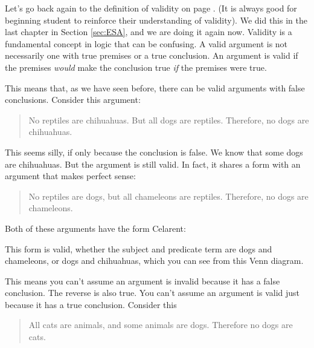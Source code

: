 Let's go back again to the definition of validity on page \pageref{def:valid}. (It is always good for beginning student to reinforce their understanding of validity). We did this in the last chapter in Section \ref{sec:ESA}, and we are doing it again now. \label{valid_definition_reinforcement} Validity is a fundamental concept in logic that can be confusing. A valid argument is not necessarily one with true premises or a true conclusion. An argument is valid if the premises \emph{would} make the conclusion true \emph{if} the premises were true.

This means that, as we have seen before, there can be valid arguments with false conclusions. Consider this argument:

\begin{quotation}\noindent No reptiles are chihuahuas. But all dogs are reptiles. Therefore, no dogs are chihuahuas. \end{quotation}

This seems silly, if only because the conclusion is false. We know that some dogs are chihuahuas. But the argument is still valid. In fact, it shares a form with an argument that makes perfect sense:

\begin{quotation}\noindent No reptiles are dogs, but all chameleons are reptiles. Therefore, no dogs are chameleons. \end{quotation}

Both of these arguments have the form Celarent:

\begin{kormanize}
\end{kormanize}

This form is valid, whether the subject and predicate term are dogs and chameleons, or dogs and chihuahuas, which you can see from this Venn diagram.



This means you can't assume an argument is invalid because it has a false conclusion. The reverse is also true. You can't assume an argument is valid just because it has a true conclusion. Consider this

\begin{quotation}  All cats are animals, and some animals are dogs. Therefore no dogs are cats. \end{quotation}

